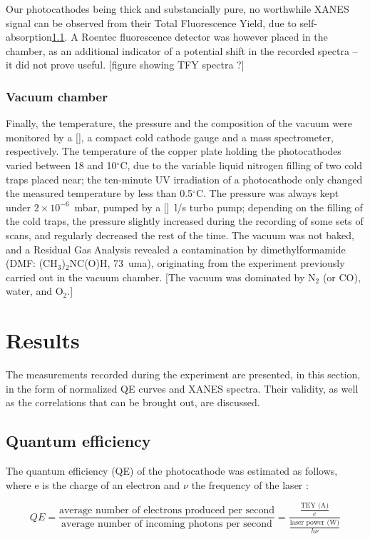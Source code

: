 \documentclass[aip,graphicx]{revtex4-1}
\begin{document}
Our photocathodes being thick and substancially pure, no worthwhile XANES signal can be observed from their Total Fluorescence Yield, due to self-absorption\ref{}. A Roentec\textsuperscript{\textregistered} fluorescence detector was however placed in the chamber, as an additional indicator of a potential shift in the recorded spectra -- it did not prove useful.
[figure showing TFY spectra ?]

\subsubsection*{Vacuum chamber}
Finally, the temperature, the pressure and the composition of the vacuum were monitored by a [], a compact cold cathode gauge and a mass spectrometer, respectively. The temperature of the copper plate holding the photocathodes varied between 18 and 10$^\circ$C, due to the variable liquid nitrogen filling of two cold traps placed near; the ten-minute UV irradiation of a photocathode only changed the measured temperature by less than 0.5$^\circ$C. The pressure was always kept under $2\times10^{-6}$~mbar, pumped by a []~l/s turbo pump; depending on the filling of the cold traps, the pressure slightly increased during the recording of some sets of scans, and regularly decreased the rest of the time. The vacuum was not baked, and a Residual Gas Analysis revealed a contamination by dimethylformamide (DMF: (CH$_3$)$_2$NC(O)H, 73~uma), originating from the experiment previously carried out in the vacuum chamber. [The vacuum was dominated by N$_2$ (or CO), water, and O$_2$.]

\section{Results}

The measurements recorded during the experiment are presented, in this section, in the form of normalized QE curves and XANES spectra. Their validity, as well as the correlations that can be brought out, are discussed.

\subsection{Quantum efficiency}

The quantum efficiency (QE) of the photocathode was estimated as follows, where e is the charge of an electron and $\nu$ the frequency of the laser :

\begin{equation}
QE = \frac{\mbox{average number of electrons produced per second}}{\mbox{average number of incoming photons per second}} = \frac{\frac{\mbox{TEY (A)}}{e}}{\frac{\mbox{laser power (W)}}{h\nu}}
\end{equation}
\end{document}
